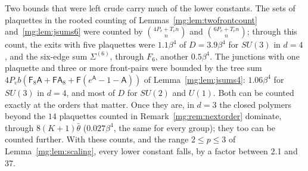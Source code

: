 \documentclass[11pt,a4paper]{article}
\theoremstyle{definition}
\theoremstyle{remark}
\begin{document}
Two bounds that were left crude carry much of the lower constants. The sets of plaquettes in the rooted counting of Lemmas~\ref{mg:lem:twofrontcount}
and~\ref{mg:lem:jsums6} were counted by $\binom{4P_v+T_vn}n$ and $\binom{6P_v+T_vn}n$; through this count, the exits with five plaquettes were $1.1\beta^4$ of
$D=3.9\beta^4$ for $SU(3)$ in $d=4$, and the six-edge sum $\Sigma^{(6)}$, through $F_6$, another $0.5\beta^4$. The junctions with one plaquette and three or more
front-pairs were bounded by the tree sum $4P_vb(\mathsf F_8\mathsf A+\mathsf F\mathsf A_8+\mathsf F(e^{\mathsf A}-1-\mathsf A))$ of Lemma~\ref{mg:lem:jsums4}: $1.06\beta^4$ for
$SU(3)$ in $d=4$, and most of $D$ for $SU(2)$ and $U(1)$. Both can be counted exactly at the orders that matter. Once they are, in $d=3$ the closed polymers
beyond the $14$ plaquettes counted in Remark~\ref{mg:rem:nextorder} dominate, through $8(K+1)\bar\theta$ ($0.027\beta^4$, the same for every group); they too can be counted further. With
these counts, and the range $2\le p\le3$ of Lemma~\ref{mg:lem:scaling}, every lower constant falls, by a factor between 2.1 and 37.
\end{document}
